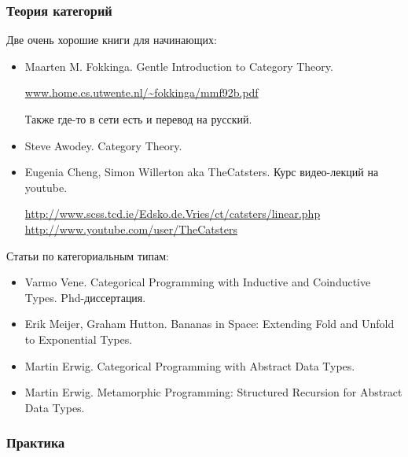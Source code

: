 \subsubsection{Теория категорий}

Две очень хорошие книги для начинающих:

\begin{itemize}
\item Maarten M. Fokkinga. Gentle Introduction to Category Theory.

\url{www.home.cs.utwente.nl/~fokkinga/mmf92b.pdf}

Также где-то в сети есть и перевод на русский.

\item Steve Awodey. Category Theory.
    
\end{itemize}

\begin{itemize}

\item Eugenia Cheng, Simon Willerton aka TheCatsters. Курс видео-лекций
    на youtube. 

    \url{http://www.scss.tcd.ie/Edsko.de.Vries/ct/catsters/linear.php}
    \url{http://www.youtube.com/user/TheCatsters}
\end{itemize}

Статьи по категориальным типам:

\begin{itemize}

\item Varmo Vene. Categorical Programming 
    with Inductive and Coinductive Types. Phd-диссертация.
    
\item Erik Meijer, Graham Hutton.
    Bananas in Space: Extending Fold and Unfold to Exponential Types.

\item Martin Erwig. Categorical Programming with Abstract Data Types.

\item Martin Erwig. Metamorphic Programming: Structured Recursion 
    for Abstract Data Types.

\end{itemize}

\subsubsection{Практика}

